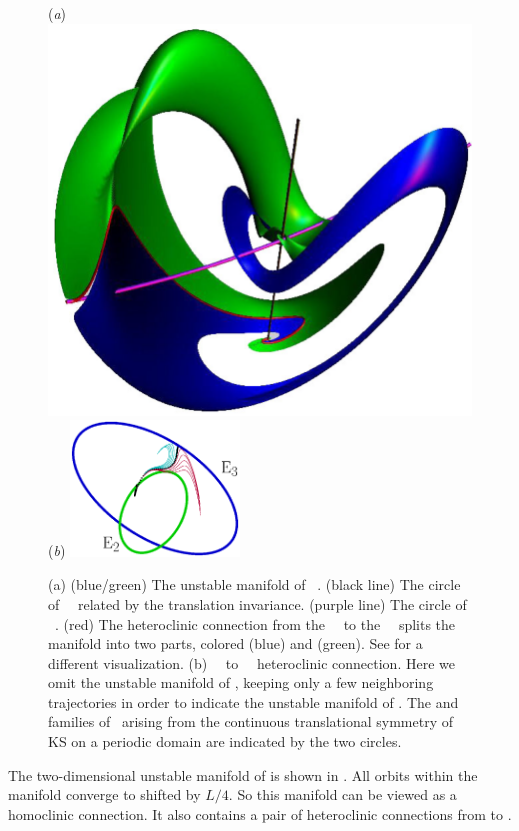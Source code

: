 \begin{figure}[t]
\begin{center}
(\textit{a}) \includegraphics[height=0.4\textwidth]{figs/ks22manifold1.eps}
(\textit{b}) \includegraphics[width=0.4\textwidth]{figs/ks22E2-E3hetero.eps}
\end{center}
\caption{
(a) (blue/green) The unstable manifold of ~\eqv.
    (black line) The circle of ~\eqva\
related by the translation invariance.
(purple line) The circle  of ~\eqva.
(red) The heteroclinic connection
from the ~\eqv\ to the ~\eqv\ splits
the manifold into two parts,
colored (blue) and (green).  See
 for a different visualization.
(b) ~\eqv\ to ~\eqv\ heteroclinic
connection. Here we omit the unstable manifold of ,
keeping only a few neighboring trajectories in order to indicate
the unstable manifold of . The \EQV{2} and \EQV{3}
families of \eqva\ arising from the continuous translational
symmetry of KS on a periodic domain are indicated by the two circles.
        }
\label{f:KS22Manifold}
\end{figure}

The two-dimensional unstable manifold of  is shown in
.  All orbits within the manifold converge
to \EQV{2} shifted by $L/4$.  So this manifold can be viewed as a homoclinic
connection.  It also contains a pair of heteroclinic connections from
\EQV{2} to \EQV{3}.

